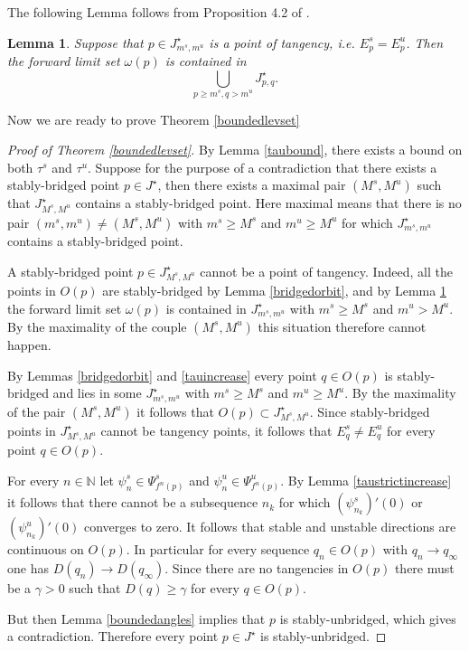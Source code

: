 \documentclass[10pt,a4paper]{article}
\newtheorem{lemma}[theorem]{Lemma}
\begin{document}
The following Lemma follows from Proposition 4.2 of \cite{BSh}.

\begin{lemma}
\label{tangency}
Suppose that $p\in J^\star_{m^s,m^u}$ is a point of tangency, i.e. $E^s_p=E^u_p$. Then the forward limit set $\omega(p)$ is contained in
$$
\bigcup_{p\geq m^s, q>m^u} J^\star_{p,q}.
$$
\end{lemma}

Now we are ready to prove Theorem \ref{boundedlevset}

\begin{proof}[Proof of Theorem \ref{boundedlevset}]
By Lemma \ref{taubound}, there exists a bound on both $\tau^s$ and $\tau^u$. Suppose for the purpose of a contradiction that there exists a stably-bridged point $p\in J^\star$, then there exists a maximal pair $(M^s,M^u)$ such that $J^\star_{M^s,M^u}$ contains a stably-bridged point. Here maximal means that there is no pair $(m^s,m^u)\neq(M^s,M^u)$ with $m^s\geq M^s$ and $m^u\geq M^u$ for which $J^\star_{m^s,m^u}$ contains a stably-bridged point.

A stably-bridged point $p\in J^\star_{M^s,M^u}$ cannot be a point of tangency. Indeed, all the points in $O(p)$ are stably-bridged by Lemma \ref{bridgedorbit}, and by Lemma \ref{tangency} the forward limit set $\omega(p)$ is contained in
$J^\star_{m^s,m^u}$ with $m^s\geq M^s$ and $m^u>M^u$. By the maximality of the couple $(M^s,M^u)$ this situation therefore cannot happen.

By Lemmas \ref{bridgedorbit} and \ref{tauincrease} every point $q\in O(p)$ is stably-bridged and lies in some $J^\star_{m^s,m^u}$ with $m^s\geq M^s$ and $m^u\geq M^u$. By the maximality of the pair $(M^s,M^u)$ it follows that $O(p)\subset J^\star_{M^s,M^u}$. Since stably-bridged points in $J^\star_{M^s,M^u}$ cannot be tangency points, it follows that $E^s_q \neq E^u_q$ for every point $q\in O(p)$.

For every $n \in \mathbb N$ let $\psi_n^s\in \Psi^s_{f^n(p)}$ and $\psi_n^u\in\Psi^u_{f^n(p)}$. By Lemma \ref{taustrictincrease} it follows that there cannot be a subsequence $n_k$ for which $(\psi^s_{n_k})'(0)$ or $(\psi^u_{n_k})'(0)$ converges to zero. It follows that stable and unstable directions are continuous on $O(p)$. In particular for every sequence $q_n\in O(p)$ with $q_n\to q_\infty$ one has $D(q_n)\to D(q_\infty)$. Since there are no tangencies in $O(p)$ there must be a $\gamma>0$ such that $D(q)\geq \gamma$ for every $q\in O(p)$.

But then Lemma \ref{boundedangles} implies that $p$ is stably-unbridged, which gives a contradiction. Therefore every point $p\in J^\star$ is stably-unbridged.
\end{proof}
\end{document}
